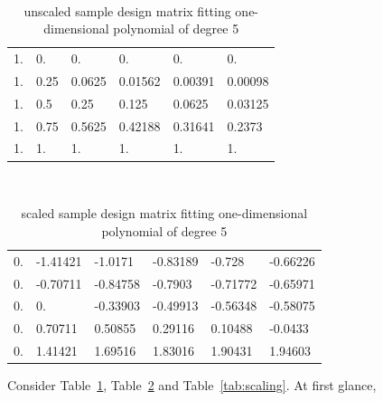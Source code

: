 \documentclass[twoside,11pt]{report}
\begin{document}
\begin{table}[!h]
\caption{unscaled sample design matrix fitting one-dimensional polynomial of degree 5}
\label{tab:unscaled}
\tt
\centering
\begin{tabular}{llllll}
    1. &     0.  &    0.  &    0.   &   0.   &   0.     \\
    1. &     0.25 &   0.0625 & 0.01562& 0.00391& 0.00098\\
    1.    &  0.5     &0.25 &   0.125 &  0.0625 & 0.03125\\
    1.   &   0.75  &  0.5625 & 0.42188 &0.31641& 0.2373 \\
    1.  &    1.   &   1.  &    1.  &    1.    &  1.
\end{tabular}%
\end{table}
\begin{table}[!h]
\caption{scaled sample design matrix fitting one-dimensional polynomial of degree 5}
\label{tab:scaled}
\tt
\centering
\begin{tabular}{llllll}
     0. &     -1.41421& -1.0171&  -0.83189& -0.728 &  -0.66226\\
     0.  &    -0.70711& -0.84758& -0.7903 & -0.71772& -0.65971\\
     0.  &     0.    &  -0.33903& -0.49913& -0.56348& -0.58075\\
     0.  &     0.70711&  0.50855&  0.29116 & 0.10488& -0.0433 \\
     0.  &     1.41421&  1.69516 & 1.83016 & 1.90431&  1.94603
\end{tabular}%
\end{table}
\begin{table}[!h]
\caption{}
\label{tab:scaling}
\vspace{1mm}
\centering
{}
\end{table}
Consider Table~\ref{tab:unscaled}, Table~\ref{tab:scaled} and Table~\ref{tab:scaling}. At first glance, 
\end{document}
